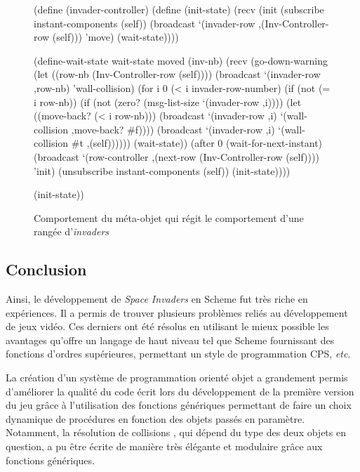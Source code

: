 \documentclass[12pt,twoside,letterpaper,francais]{book}
\newcommand{\scheme}[1]{\selectlanguage{english}{\tt #1}\selectlanguage{french}}
\begin{document}
\begin{figure}[htb!]
  \begin{schemecode}
(define (invader-controller)
  (define (init-state)
    (recv
     (init
      (subscribe instant-components (self))
      (broadcast `(invader-row ,(Inv-Controller-row (self)))
                 'move)
      (wait-state))))

  (define-wait-state wait-state moved (inv-nb)
    (recv
     (go-down-warning
      (let ((row-nb (Inv-Controller-row (self))))
        (broadcast `(invader-row ,row-nb) 'wall-collision)
        (for i 0 (< i invader-row-number)
             (if (not (= i row-nb))
                 (if (not (zero? (msg-list-size `(invader-row ,i))))
                     (let ((move-back? (< i row-nb)))
                       (broadcast `(invader-row ,i)
                                  `(wall-collision ,move-back? \#f))))
                 (broadcast `(invader-row ,i)
                            `(wall-collision  \#t ,(self))))))
      (wait-state))
     (after 0
            (wait-for-next-instant)
            (broadcast `(row-controller
                         ,(next-row (Inv-Controller-row (self))))
                       'init)
            (unsubscribe instant-components (self))
            (init-state))))

  (init-state))
  \end{schemecode}
  \caption{Comportement du méta-objet \scheme{invader-controller} qui
    régit le comportement d'une rangée d'\textit{invaders}}
  \label{Exp:inv-cnt}
\end{figure}


\FloatBarrier
\subsection{Conclusion}
Ainsi, le dévelop\-pement de \textit{Space Invaders} en Scheme fut
très riche en expériences. Il a permis de trouver plusieurs problèmes
reliés au dévelop\-pement de jeux vidéo. Ces derniers ont été résolus
en utilisant le mieux possible les avantages qu'offre un langage de
haut niveau tel que Scheme fournissant des fonctions d'ordres
supérieures, permettant un style de programmation CPS, \textit{etc}.

La création d'un système de programmation orienté objet a grandement
permis d'améliorer la qualité du code écrit lors du dévelop\-pement de
la première version du jeu grâce à l'utilisation des fonctions
génériques permettant de faire un choix dynamique de procédures en
fonction des objets passés en paramètre. Notamment, la résolution de
collisions , qui dépend du type des deux objets en question, a pu être
écrite de manière très élégante et modulaire grâce aux fonctions
génériques.
\end{document}
